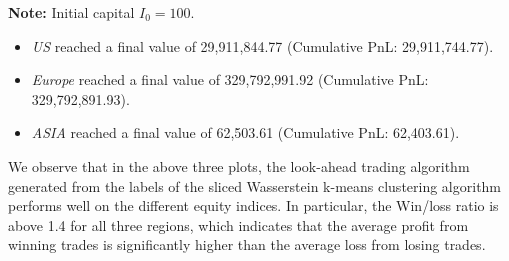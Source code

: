 \documentclass[12pt,a4paper]{report}
\begin{document}
\begin{table}[H]
    \centering
    \caption{Cross-Regional Portfolio Performance Summary}
    \label{tab:portfolio_performance_final}
    \vspace{2mm}
    \vspace{2mm}
    \begin{flushleft}
        \small \textbf{Note:} Initial capital $I_0 = 100$. 
        \begin{itemize}
            \item \textit{US} reached a final value of 29,911,844.77 (Cumulative PnL: 29,911,744.77).
            \item \textit{Europe} reached a final value of 329,792,991.92 (Cumulative PnL: 329,792,891.93).
            \item \textit{ASIA} reached a final value of 62,503.61 (Cumulative PnL: 62,403.61).
        \end{itemize}
    \end{flushleft}
\end{table}


We observe that in the above three plots, the look-ahead trading algorithm generated from the labels of the sliced Wasserstein k-means clustering algorithm performs well on the different equity indices. 
In particular, the Win/loss ratio is above 1.4 for all three regions, which indicates that the average profit from winning trades is significantly higher than the average loss from losing trades.
\end{document}
